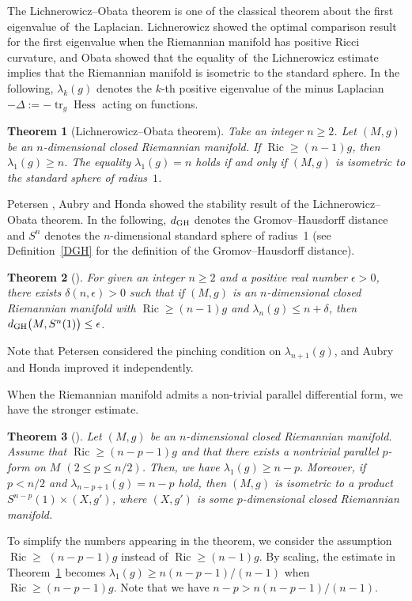 \documentclass[pdftex]{sigma}
\numberwithin{equation}{section}
\newtheorem{Thm}{Theorem}[section]
\theoremstyle{definition}
\newcommand{\Ric}{\operatorname{Ric}}
\newcommand{\tr}{\operatorname{tr}}
\newcommand{\Hess}{\operatorname{Hess}}
\begin{document}
The Lichnerowicz--Obata theorem is one of the classical theorem about the first eigenvalue of~the Laplacian.
Lichnerowicz showed the optimal comparison result for the first eigenvalue when the Riemannian manifold has positive Ricci curvature, and Obata showed that the equality of~the Lichnerowicz estimate implies that the Riemannian manifold is isometric to the standard sphere.
In the following, $\lambda_k(g)$ denotes the $k$-th positive eigenvalue of the minus Laplacian $-\Delta:=-\tr_g \Hess$ acting on functions.
\begin{Thm}[Lichnerowicz--Obata theorem]\label{LiOb}
Take an integer $n\geq 2$.
Let $(M,g)$ be an $n$-dimen\-sional closed Riemannian manifold. If $\Ric \geq (n-1) g$, then $\lambda_1(g)\geq n$.
The equality $\lambda_1(g)=n$ holds if and only if $(M,g)$ is isometric to the standard sphere of radius~$1$.
\end{Thm}

Petersen \cite{Pe1}, Aubry \cite{Au} and Honda \cite{Ho} showed the stability result of the Lichnerowicz--Obata theorem.
In the following, $d_{{\rm GH}}$ denotes the Gromov--Hausdorff distance and $S^n$ denotes the $n$-dimensional standard sphere of radius~1 (see Definition~\ref{DGH} for the definition of the Gromov--Hausdorff distance).
\begin{Thm}[\cite{Au, Ho, Pe1}]\label{PA}
For given an integer $n\geq 2$ and a positive real number $\epsilon>0$, there exists $\delta(n,\epsilon)>0$ such that if $(M,g)$ is an $n$-dimensional closed Riemannian manifold with $\Ric \geq (n-1) g$ and $\lambda_n(g)\leq n+\delta$, then $d_{{\rm GH}}\big(M,S^n(1)\big)\leq \epsilon$.
\end{Thm}
Note that Petersen considered the pinching condition on $\lambda_{n+1}(g)$, and Aubry and Honda improved it independently.

When the Riemannian manifold admits a non-trivial parallel differential form, we have the stronger estimate.
\begin{Thm}[\cite{ Ai3, gr}]\label{gros}
Let $(M,g)$ be an $n$-dimensional closed Riemannian manifold.
Assume that $\Ric\geq (n-p-1)g$ and that there exists a nontrivial parallel $p$-form on $M$ $(2\leq p\leq n/2)$.
Then, we have
$
\lambda_1(g)\geq n-p.
$
Moreover, if $p<n/2$ and $\lambda_{n-p+1}(g)=n-p$ hold, then $(M,g)$ is isometric to a product $S^{n-p}(1)\times (X,g')$, where $(X,g')$ is some $p$-dimensional closed Riemannian manifold.
\end{Thm}
To simplify the numbers appearing in the theorem, we consider the assumption $\Ric\geq $ \mbox{$(n-p-1)g$} instead of $\Ric\geq (n-1)g$.
By scaling, the estimate in Theorem~\ref{LiOb} becomes $\lambda_1(g)\geq n(n-p-1)/(n-1)$ when $\Ric\geq (n-p-1)g$.
Note that we have $n-p>n(n-p-1)/(n-1)$.
\end{document}
